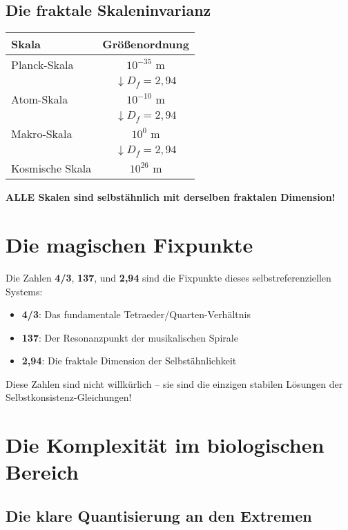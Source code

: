\documentclass[12pt,a4paper]{article}
\newcommand{\Df}{D_f}
\begin{document}
	\subsection{Die fraktale Skaleninvarianz}
	
	\begin{center}
		\begin{tabular}{lc}
			\toprule
			Skala & Größenordnung\\
			\midrule
			Planck-Skala & $10^{-35}$ m\\
			& $\downarrow \Df = 2{,}94$\\
			Atom-Skala & $10^{-10}$ m\\
			& $\downarrow \Df = 2{,}94$\\
			Makro-Skala & $10^0$ m\\
			& $\downarrow \Df = 2{,}94$\\
			Kosmische Skala & $10^{26}$ m\\
			\bottomrule
		\end{tabular}
	\end{center}
	
	\textbf{ALLE Skalen sind selbstähnlich mit derselben fraktalen Dimension!}
	
	\section{Die magischen Fixpunkte}
	
	Die Zahlen \textbf{4/3}, \textbf{137}, und \textbf{2{,}94} sind die Fixpunkte dieses selbstreferenziellen Systems:
	
	\begin{itemize}
		\item \textbf{4/3}: Das fundamentale Tetraeder/Quarten-Verhältnis
		\item \textbf{137}: Der Resonanzpunkt der musikalischen Spirale
		\item \textbf{2{,}94}: Die fraktale Dimension der Selbstähnlichkeit
	\end{itemize}
	
	Diese Zahlen sind nicht willkürlich -- sie sind die einzigen stabilen Lösungen der Selbstkonsistenz-Gleichungen!
	
	\section{Die Komplexität im biologischen Bereich}
	
	\subsection{Die klare Quantisierung an den Extremen}
	
\end{document}
